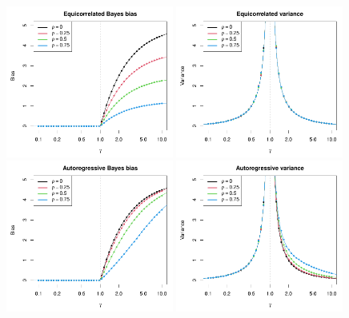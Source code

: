 \documentclass{article}
\begin{document}
\begin{figure}[p]
\centering
\includegraphics[width=0.49\textwidth]{bias_ec.pdf}
\includegraphics[width=0.49\textwidth]{var_ec.pdf}
\includegraphics[width=0.49\textwidth]{bias_ar.pdf}
\includegraphics[width=0.49\textwidth]{var_ar.pdf}

\end{figure}
\end{document}

